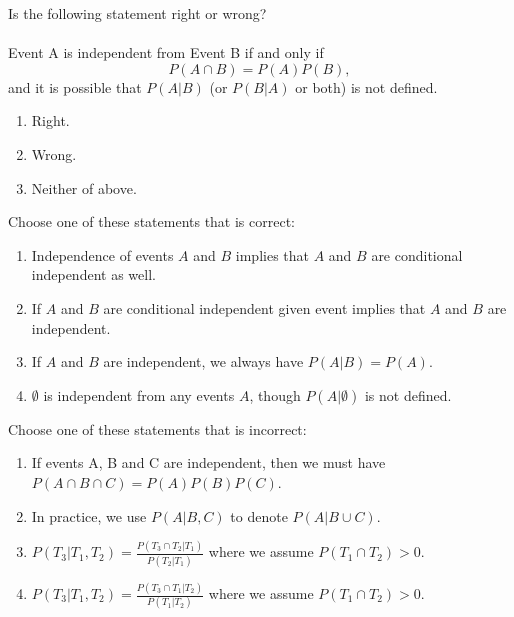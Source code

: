 \documentclass[poll_tutorial_format]{subfiles}
\begin{document}
\begin{exercise} 
Is the following statement right or wrong?\\~\\ Event A is independent from Event B if and only if $$P(A\cap B)=P(A)P(B),$$ and it is possible that $P(A|B)$ (or $P(B|A)$ or both) is not defined. %
	\begin{enumerate}
		\item Right.
		\item  Wrong.
		\item Neither of above.
	\end{enumerate}
\end{exercise}


\begin{exercise} 
	Choose one of these statements that is correct: %
	\begin{enumerate}
		\item Independence of events $A$ and $B$ implies that $A$ and $B$ are conditional independent as well.
		\item If $A$ and $B$ are conditional independent given event implies that $A$ and $B$ are independent. 
		\item If $A$ and $B$ are independent, we always have $P(A|B)=P(A)$. 
		\item  $\emptyset$ is independent from any events $A$, though $P(A|\emptyset)$ is not defined.
	\end{enumerate}
\end{exercise}


\begin{exercise}
	Choose one of these statements that is incorrect: %
	\begin{enumerate}
		\item If events A, B and C are independent, then we must have $P(A\cap B\cap C)=P(A)P(B)P(C)$.
		\item In practice, we use $P(A|B,C)$ to denote $P(A|B\cup C)$. 
		\item $P(T_3|T_1,T_2)=\frac{P(T_3\cap T_2|T_1)}{P(T_2|T_1)}$ where we assume $P(T_1\cap T_2)>0$. 
		\item $P(T_3|T_1,T_2)=\frac{P(T_3\cap T_1|T_2)}{P(T_1|T_2)}$ where we assume $P(T_1\cap T_2)>0$. 
	\end{enumerate}
\end{exercise}


%
	
 	
	
	
	
\end{document}
